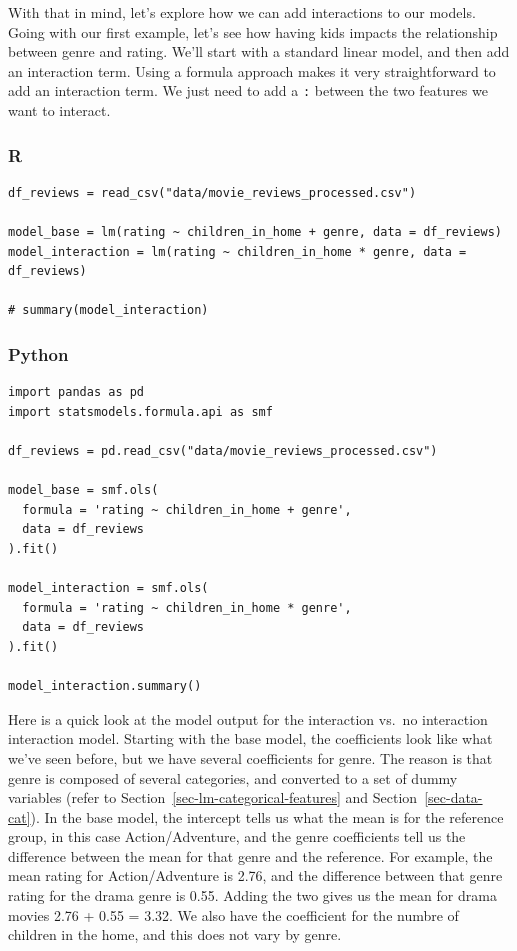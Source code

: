\documentclass[
  letterpaper,
]{krantz}
\begin{document}
With that in mind, let's explore how we can add interactions to our
models. Going with our first example, let's see how having kids impacts
the relationship between genre and rating. We'll start with a standard
linear model, and then add an interaction term. Using a formula approach
makes it very straightforward to add an interaction term. We just need
to add a \texttt{:} between the two features we want to interact.

\subsubsection{R}

\begin{verbatim}
df_reviews = read_csv("data/movie_reviews_processed.csv")

model_base = lm(rating ~ children_in_home + genre, data = df_reviews)
model_interaction = lm(rating ~ children_in_home * genre, data = df_reviews)

# summary(model_interaction)
\end{verbatim}

\subsubsection{Python}

\begin{verbatim}
import pandas as pd
import statsmodels.formula.api as smf

df_reviews = pd.read_csv("data/movie_reviews_processed.csv")

model_base = smf.ols(
  formula = 'rating ~ children_in_home + genre', 
  data = df_reviews
).fit()

model_interaction = smf.ols(
  formula = 'rating ~ children_in_home * genre', 
  data = df_reviews
).fit()

model_interaction.summary()
\end{verbatim}

Here is a quick look at the model output for the interaction vs.~no
interaction interaction model. Starting with the base model, the
coefficients look like what we've seen before, but we have several
coefficients for genre. The reason is that genre is composed of several
categories, and converted to a set of dummy variables (refer to
Section~\ref{sec-lm-categorical-features} and
Section~\ref{sec-data-cat}). In the base model, the intercept tells us
what the mean is for the reference group, in this case Action/Adventure,
and the genre coefficients tell us the difference between the mean for
that genre and the reference. For example, the mean rating for
Action/Adventure is 2.76, and the difference between that genre rating
for the drama genre is 0.55. Adding the two gives us the mean for drama
movies 2.76 + 0.55 = 3.32. We also have the coefficient for the numbre
of children in the home, and this does not vary by genre.
\end{document}
